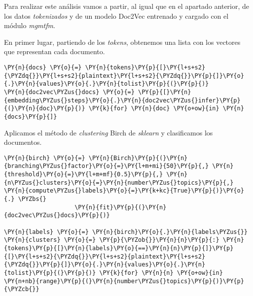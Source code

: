 Para realizar este análisis vamos a partir, al igual que en el apartado anterior, de los datos \textit{tokenizados} y de un modelo Doc2Vec entrenado y cargado con el módulo \textit{mgmtfm}.


    En primer lugar, partiendo de los \textit{tokens}, obtenemos una lista con los vectores que representan cada documento.
\vspace{0.5cm}
    \begin{tcolorbox}[breakable, size=fbox, boxrule=1pt, pad at break*=1mm,colback=cellbackground, colframe=cellborder]
\begin{Verbatim}[commandchars=\\\{\}]
\PY{n}{docs} \PY{o}{=} \PY{n}{tokens}\PY{p}{[}\PY{l+s+s2}{\PYZdq{}}\PY{l+s+s2}{plaintext}\PY{l+s+s2}{\PYZdq{}}\PY{p}{]}\PY{o}{.}\PY{n}{values}\PY{o}{.}\PY{n}{tolist}\PY{p}{(}\PY{p}{)}
\PY{n}{doc2vec\PYZus{}docs} \PY{o}{=} \PY{p}{[}\PY{n}{embedding\PYZus{}steps}\PY{o}{.}\PY{n}{doc2vec\PYZus{}infer}\PY{p}{(}\PY{n}{doc}\PY{p}{)} \PY{k}{for} \PY{n}{doc} \PY{o+ow}{in} \PY{n}{docs}\PY{p}{]}
\end{Verbatim}
\end{tcolorbox}

    Aplicamos el método de \textit{clustering} Birch de \textit{sklearn} y clasificamos los documentos.
\vspace{0.5cm}
    \begin{tcolorbox}[breakable, size=fbox, boxrule=1pt, pad at break*=1mm,colback=cellbackground, colframe=cellborder]
\begin{Verbatim}[commandchars=\\\{\}]
\PY{n}{birch} \PY{o}{=} \PY{n}{Birch}\PY{p}{(}\PY{n}{branching\PYZus{}factor}\PY{o}{=}\PY{l+m+mi}{50}\PY{p}{,} \PY{n}{threshold}\PY{o}{=}\PY{l+m+mf}{0.5}\PY{p}{,} \PY{n}{n\PYZus{}clusters}\PY{o}{=}\PY{n}{number\PYZus{}topics}\PY{p}{,} \PY{n}{compute\PYZus{}labels}\PY{o}{=}\PY{k+kc}{True}\PY{p}{)}\PY{o}{.} \PYZbs{}
                    \PY{n}{fit}\PY{p}{(}\PY{n}{doc2vec\PYZus{}docs}\PY{p}{)}

\PY{n}{labels} \PY{o}{=} \PY{n}{birch}\PY{o}{.}\PY{n}{labels\PYZus{}}
\PY{n}{clusters} \PY{o}{=} \PY{p}{\PYZob{}}\PY{n}{n}\PY{p}{:} \PY{n}{tokens}\PY{p}{[}\PY{n}{labels}\PY{o}{==}\PY{n}{n}\PY{p}{]}\PY{p}{[}\PY{l+s+s2}{\PYZdq{}}\PY{l+s+s2}{plaintext}\PY{l+s+s2}{\PYZdq{}}\PY{p}{]}\PY{o}{.}\PY{n}{values}\PY{o}{.}\PY{n}{tolist}\PY{p}{(}\PY{p}{)} \PY{k}{for} \PY{n}{n} \PY{o+ow}{in} \PY{n+nb}{range}\PY{p}{(}\PY{n}{number\PYZus{}topics}\PY{p}{)}\PY{p}{\PYZcb{}}
\end{Verbatim}
\end{tcolorbox}

